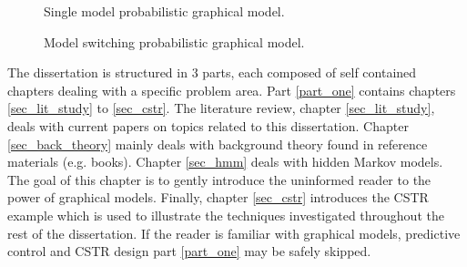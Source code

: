 \begin{figure}[H]
 \centering
\begin{minipage}[b]{0.45\textwidth}
 \centering
{}
\caption{Single model probabilistic graphical model.}
\label{fig_linear}
\end{minipage}\hfill
\begin{minipage}[b]{0.45\textwidth}
 \centering
{}
\caption{Model switching probabilistic graphical model.}
\label{fig_switch_linear}
\end{minipage}
\end{figure}
The dissertation is structured in 3 parts, each composed of self contained chapters dealing with a specific problem area. Part \ref{part_one} contains chapters \ref{sec_lit_study} to \ref{sec_cstr}. The literature review, chapter \ref{sec_lit_study}, deals with current papers on topics related to this dissertation. Chapter \ref{sec_back_theory} mainly deals with background theory found in reference materials (e.g. books). Chapter \ref{sec_hmm} deals with hidden Markov models. The goal of this chapter is to gently introduce the uninformed reader to the power of graphical models. Finally, chapter \ref{sec_cstr} introduces the CSTR example which is used to illustrate the techniques investigated throughout the rest of the dissertation. If the reader is familiar with graphical models, predictive control and CSTR design part \ref{part_one} may be safely skipped.

